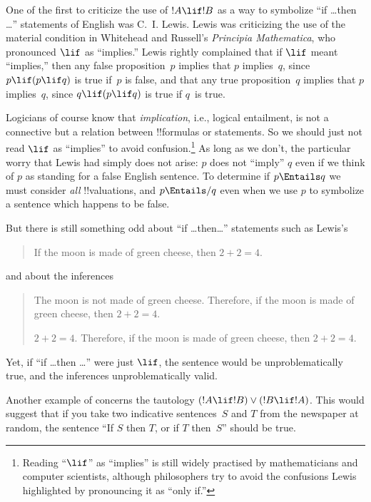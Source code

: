 \documentclass[../../../include/open-logic-section]{subfiles}
\begin{document}


One of the first to criticize the use of $!A \lif !B$ as a way to
symbolize ``if \dots then \dots'' statements of English was
C.~I. Lewis. Lewis was criticizing the use of the material condition
in Whitehead and Russell's \emph{Principia Mathematica}, who
pronounced $\lif$ as ``implies.''  Lewis rightly complained that if
$\lif$ meant ``implies,'' then any false proposition~$p$ implies that
$p$ implies~$q$, since $p \lif (p \lif q)$ is true if~$p$ is false,
and that any true proposition~$q$ implies that $p$ implies~$q$, since
$q \lif (p \lif q)$ is true if $q$~is true.

Logicians of course know that \emph{implication}, i.e., logical
entailment, is not a connective but a relation between !!{formula}s or
statements. So we should just not read $\lif$ as ``implies'' to avoid
confusion.\footnote{Reading ``$\lif$'' as ``implies'' is still widely
  practised by mathematicians and computer scientists, although
  philosophers try to avoid the confusions Lewis highlighted by
  pronouncing it as ``only if.''} As long as we don't, the particular
worry that Lewis had simply does not arise: $p$ does not ``imply'' $q$
even if we think of $p$ as standing for a false English sentence. To
determine if $p \Entails q$ we must consider \emph{all}
!!{valuation}s, and $p \Entails/ q$ even when we use $p$ to symbolize
a sentence which happens to be false.

But there is still something odd about ``if \dots then\dots''
statements such as Lewis's
\begin{quote}
If the moon is made of green cheese, then $2+2=4$.
\end{quote}
and about the inferences
\begin{quote}
  The moon is not made of green cheese. Therefore, if the moon is made
  of green cheese, then $2+2=4$.

  $2+2 = 4$. Therefore, if the moon is made
  of green cheese, then $2+2=4$.
\end{quote}
Yet, if ``if \dots then \dots'' were just $\lif$, the sentence would
be unproblematically true, and the inferences unproblematically valid.

Another example of concerns the tautology $(!A \lif !B) \lor (!B \lif
!A)$.  This would suggest that if you take two indicative
sentences~$S$ and $T$ from the newspaper at random, the sentence ``If
$S$ then $T$, or if $T$ then~$S$'' should be true.
\end{document}
